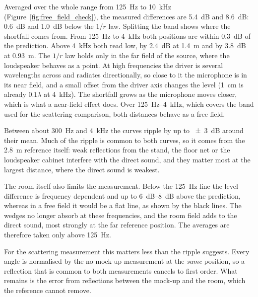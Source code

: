 \documentclass[a4paper,10pt]{article}
\begin{document}
Averaged over the whole range from \SI{125}{Hz} to \SI{10}{kHz}
(Figure~\ref{fig:free_field_check}), the measured differences are \SI{5.4}{dB} and
\SI{8.6}{dB}: \SI{0.6}{dB} and \SI{1.0}{dB} below the $1/r$ law. Splitting the band shows
where the shortfall comes from. From \SI{125}{Hz} to \SI{4}{kHz} both positions are within
\SI{0.3}{dB} of the prediction. Above \SI{4}{kHz} both read low, by \SI{2.4}{dB} at
\SI{1.4}{m} and by \SI{3.8}{dB} at \SI{0.93}{m}. The $1/r$ law holds only in the far
field of the source, where the loudspeaker behaves as a point. At high frequencies the
driver is several wavelengths across and radiates directionally, so close to it the
microphone is in its near field, and a small offset from the driver axis changes the level
(\SI{1}{cm} is already $0.1\lambda$ at \SI{4}{kHz}). The shortfall grows as the microphone
moves closer, which is what a near-field effect does. Over \SI{125}{Hz}--\SI{4}{kHz}, which
covers the band used for the scattering comparison, both distances behave as a free field.

Between about \SI{300}{Hz} and \SI{4}{kHz} the curves ripple by up to \SI{\pm3}{dB}
around their mean. Much of the ripple is common to both curves, so it comes from the
\SI{2.8}{m} reference itself: weak reflections from the stand, the floor net or the
loudspeaker cabinet interfere with the direct sound, and they matter most at the largest
distance, where the direct sound is weakest.

The room itself also limits the measurement. Below the \SI{125}{Hz} line the level
difference is frequency dependent and up to \SIrange{6}{8}{dB} above the prediction,
whereas in a free field it would be a flat line, as shown by the black lines. The wedges no
longer absorb at these frequencies, and the room field adds to the direct sound, most
strongly at the far reference position. The averages are therefore taken only above
\SI{125}{Hz}.

For the scattering measurement this matters less than the ripple suggests. Every angle is
normalised by the no-mock-up measurement at the \emph{same} position, so a reflection
that is common to both measurements cancels to first order. What remains is the error
from reflections between the mock-up and the room, which the reference cannot remove.
\end{document}
